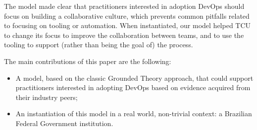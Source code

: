 


The model made clear that practitioners interested in adoption DevOps should focus on building a
collaborative culture, which prevents common pitfalls related to focusing on
tooling or automation. When instantiated,
our model helped TCU to
change its focus to improve the collaboration between teams, and to use the tooling
to support (rather than being the goal of) the process.


%

The main contributions of this paper are the following:

\begin{itemize}
\item A model, based on the classic Grounded Theory approach, that could support practitioners interested in adopting DevOps based on evidence acquired from their industry peers;
\item An instantiation of this model in a real world, non-trivial context: a Brazilian Federal Government institution.
\end{itemize}


